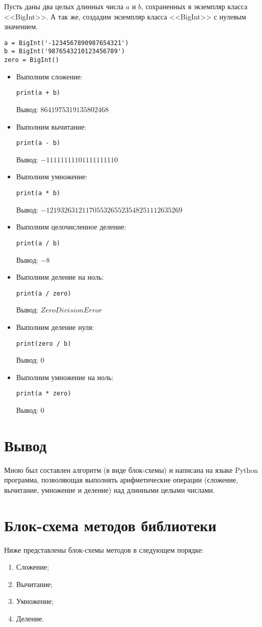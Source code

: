 Пусть даны два целых длинных числа $a$ и $b$, сохраненных в экземпляр класса <<BigInt>>.
А так же, создадим экземпляр класса <<BigInt>> с нулевым значением.
    \begin{lstlisting}
a = BigInt('-1234567890987654321')
b = BigInt('9876543210123456789')
zero = BigInt()\end{lstlisting}

    \begin{itemize}
        \item Выполним сложение:
        \begin{lstlisting}
print(a + b)\end{lstlisting}
        Вывод: $8641975319135802468$
        \item Выполним вычитание:
        \begin{lstlisting}
print(a - b)\end{lstlisting}
        Вывод: $-11111111101111111110$
        \item Выполним умножение:
        \begin{lstlisting}
print(a * b)\end{lstlisting}
        Вывод: $-12193263121170553265523548251112635269$
        \item Выполним целочисленное деление:
        \begin{lstlisting}
print(a / b)\end{lstlisting}
        Вывод: $-8$
        \item Выполним деление на ноль:
        \begin{lstlisting}
print(a / zero)\end{lstlisting}
        Вывод: $ZeroDivisionError$
        \item Выполним деление нуля:
        \begin{lstlisting}
print(zero / b)\end{lstlisting}
        Вывод: $0$
        \item Выполним умножение на ноль:
        \begin{lstlisting}
print(a * zero)\end{lstlisting}
        Вывод: $0$
    \end{itemize}

\clearpage
\section{Вывод}
Мною был составлен алгоритм (в виде блок-схемы) и написана на языке Python программа,
позволяющая выполнять арифметические операции (сложение, вычитание, умножение и деление) над длинными целыми числами.

\clearpage
\section{Блок-схема методов библиотеки}
Ниже представлены блок-схемы методов в следующем порядке:
\begin{enumerate}
    \item Сложение;
    \item Вычитание;
    \item Умножение;
    \item Деление.
\end{enumerate}

